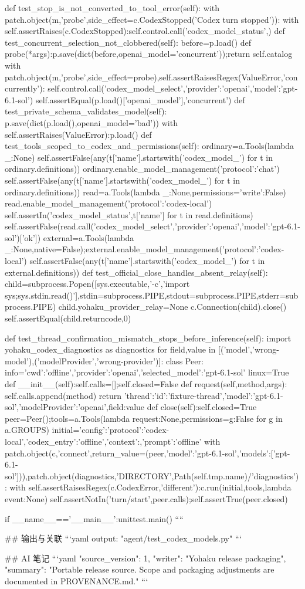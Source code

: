  def test_stop_is_not_converted_to_tool_error(self):
  with patch.object(m,'probe',side_effect=c.CodexStopped('Codex turn stopped')):
   with self.assertRaises(c.CodexStopped):self.control.call('codex_model_status',{})
 def test_concurrent_selection_not_clobbered(self):
  before=p.load()
  def probe(*args):p.save(dict(before,openai_model='concurrent'));return self.catalog
  with patch.object(m,'probe',side_effect=probe),self.assertRaisesRegex(ValueError,'concurrently'):
   self.control.call('codex_model_select',{'provider':'openai','model':'gpt-6.1-sol'})
  self.assertEqual(p.load()['openai_model'],'concurrent')
 def test_private_schema_validates_model(self):
  p.save(dict(p.load(),openai_model='bad\nmodel'))
  with self.assertRaises(ValueError):p.load()
 def test_tools_scoped_to_codex_and_permissions(self):
  ordinary=a.Tools(lambda _:None)
  self.assertFalse(any(t['name'].startswith('codex_model_') for t in ordinary.definitions))
  ordinary.enable_model_management({'protocol':'chat'})
  self.assertFalse(any(t['name'].startswith('codex_model_') for t in ordinary.definitions))
  read=a.Tools(lambda _:None,permissions={'write':False})
  read.enable_model_management({'protocol':'codex-local'})
  self.assertIn('codex_model_status',{t['name'] for t in read.definitions})
  self.assertFalse(read.call('codex_model_select',{'provider':'openai','model':'gpt-6.1-sol'})['ok'])
  external=a.Tools(lambda _:None,native=False);external.enable_model_management({'protocol':'codex-local'})
  self.assertFalse(any(t['name'].startswith('codex_model_') for t in external.definitions))
 def test_official_close_handles_absent_relay(self):
  child=subprocess.Popen([sys.executable,'-c','import sys;sys.stdin.read()'],stdin=subprocess.PIPE,stdout=subprocess.PIPE,stderr=subprocess.PIPE)
  child.yohaku_provider_relay=None
  c.Connection(child).close()
  self.assertEqual(child.returncode,0)

 def test_thread_confirmation_mismatch_stops_before_inference(self):
  import yohaku_codex_diagnostics as diagnostics
  for field,value in [('model','wrong-model'),('modelProvider','wrong-provider')]:
   class Peer:
    info={'cwd':'offline','provider':'openai','selected_model':'gpt-6.1-sol'}
    linux=True
    def __init__(self):self.calls=[];self.closed=False
    def request(self,method,args):
     self.calls.append(method)
     return {'thread':{'id':'fixture-thread'},'model':'gpt-6.1-sol','modelProvider':'openai',field:value}
    def close(self):self.closed=True
   peer=Peer();tools=a.Tools(lambda request:None,permissions={g:False for g in a.GROUPS})
   initial={'config':{'protocol':'codex-local','codex_entry':'offline'},'context':{},'prompt':'offline'}
   with patch.object(c,'connect',return_value=(peer,{'model':'gpt-6.1-sol','models':['gpt-6.1-sol']})),patch.object(diagnostics,'DIRECTORY',Path(self.tmp.name)/'diagnostics'):
    with self.assertRaisesRegex(c.CodexError,'different'):c.run(initial,tools,lambda event:None)
   self.assertNotIn('turn/start',peer.calls);self.assertTrue(peer.closed)

if __name__=='__main__':unittest.main()
````

## 输出与关联
```yaml
output: "agent/test_codex_models.py"
```

## AI 笔记
```yaml
{"source_version": 1, "writer": "Yohaku release packaging", "summary": "Portable release source. Scope and packaging adjustments are documented in PROVENANCE.md."}
```
